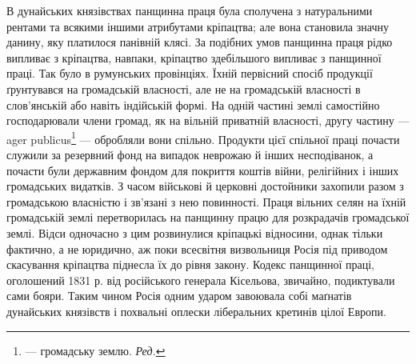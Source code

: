 В дунайських князівствах панщинна праця була сполучена
з натуральними рентами та всякими іншими атрибутами кріпацтва;
але вона становила значну данину, яку платилося панівній
клясі. За подібних умов панщинна праця рідко випливає з
кріпацтва, навпаки, кріпацтво здебільшого випливає з панщинної
праці. Так було в румунських провінціях. Їхній первісний
спосіб продукції ґрунтувався на громадській власності, але
не на громадській власності в слов’янській або навіть індійській
формі. На одній частині землі самостійно господарювали члени
громад, як на вільній приватній власності, другу частину — ager
publicus\footnote*{
— громадську землю. \emph{Ред.}
} — обробляли вони спільно. Продукти цієї спільної праці
почасти служили за резервний фонд на випадок неврожаю й інших
несподіванок, а почасти були державним фондом для покриття
коштів війни, релігійних і інших громадських видатків. З часом
військові й церковні достойники захопили разом з громадською
власністю і зв’язані з нею повинності. Праця вільних селян на
їхній громадській землі перетворилась на панщинну працю для
розкрадачів громадської землі. Відси одночасно з цим розвинулися
кріпацькі відносини, однак тільки фактично, а не юридично,
аж поки всесвітня визвольниця Росія під приводом скасування
кріпацтва піднесла їх до рівня закону. Кодекс панщинної праці,
оголошений 1831 р. від російського генерала Кісельова, звичайно,
подиктували сами бояри. Таким чином Росія одним ударом завоювала
собі маґнатів дунайських князівств і похвальні оплески
ліберальних кретинів цілої Европи.

